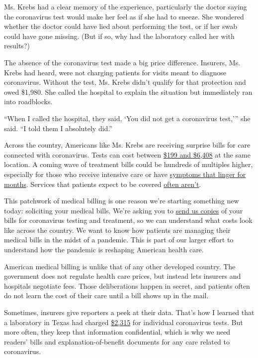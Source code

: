 Ms. Krebs had a clear memory of the experience, particularly the doctor
saying the coronavirus test would make her feel as if she had to sneeze.
She wondered whether the doctor could have lied about performing the
test, or if her swab could have gone missing. (But if so, why had the
laboratory called her with results?)

The absence of the coronavirus test made a big price difference.
Insurers, Ms. Krebs had heard, were not charging patients for visits
meant to diagnose coronavirus. Without the test, Ms. Krebs didn't
qualify for that protection and owed \$1,980. She called the hospital to
explain the situation but immediately ran into roadblocks.

``When I called the hospital, they said, `You did not get a coronavirus
test,''' she said. ``I told them I absolutely did.''

Across the country, Americans like Ms. Krebs are receiving surprise
bills for care connected with coronavirus. Tests can cost between
\href{https://www.nytimes.com/2020/06/29/upshot/coronavirus-tests-unpredictable-prices.html}{\$199
and \$6,408} at the same location. A coming wave of treatment bills
could be hundreds of multiples higher, especially for those who receive
intensive care or have
\href{https://www.nytimes.com/2020/07/01/health/coronavirus-recovery-survivors.html}{symptoms
that linger for months}. Services that patients expect to be covered
\href{https://khn.org/news/bill-of-the-month-covid19-tests-are-free-except-when-theyre-not/}{often
aren't}.

This patchwork of medical billing is one reason we're starting something
new today: soliciting your medical bills. We're asking you to
\href{https://www.nytimes.com/2020/08/03/reader-center/coronavirus-medical-bills.html}{send
us copies} of your bills for coronavirus testing and treatment, so we
can understand what costs look like across the country. We want to know
how patients are managing their medical bills in the midst of a
pandemic. This is part of our larger effort to understand how the
pandemic is reshaping American health care.

American medical billing is unlike that of any other developed country.
The government does not regulate health care prices, but instead lets
insurers and hospitals negotiate fees. Those deliberations happen in
secret, and patients often do not learn the cost of their care until a
bill shows up in the mail.

Sometimes, insurers give reporters a peek at their data. That's how I
learned that a laboratory in Texas had charged
\href{https://www.nytimes.com/2020/06/16/upshot/coronavirus-test-cost-varies-widely.html}{\$2,315}
for individual coronavirus tests. But more often, they keep that
information confidential, which is why we need readers' bills and
explanation-of-benefit documents for any care related to coronavirus.

